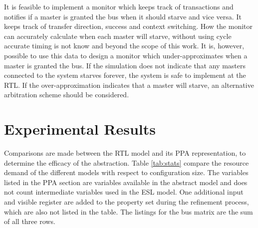 
It is feasible to implement a monitor which keeps track of transactions and notifies if a master is granted the bus when it should starve and vice versa. It keeps track of transfer direction, success and context switching. How the monitor can accurately calculate when each master will starve, without using cycle accurate timing is not know and beyond the scope of this work. It is, however, possible to use this data to design a monitor which under-approximates when a master is granted the bus. If the simulation does not indicate that any masters connected to the system starves forever, the system is safe to implement at the RTL. If the over-approximation indicates that a master will starve, an alternative arbitration scheme should be considered. 



\section{Experimental Results}
Comparisons are made between the RTL model and its PPA representation, to determine the efficacy of the abstraction. Table \ref{tab:stats} compare the resource demand of the different models with respect to configuration size. The variables listed in the PPA section are variables available in the abstract model and does not count intermediate variables used in the ESL model. One additional input and visible register are added to the property set during the refinement process, which are also not listed in the table. The listings for the bus matrix are the sum of all three rows.

